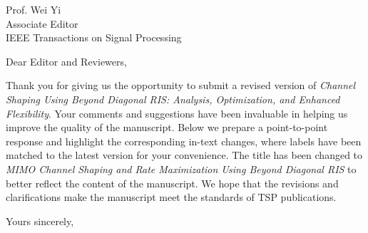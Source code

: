 \documentclass[
	fontsize=11pt,
	paper=a4,
	foldmarks=false
]{scrartcl}
\begin{document}
\begin{letter}{%
		Prof. Wei Yi\\
		Associate Editor\\
		IEEE Transactions on Signal Processing
	}
	\opening{Dear Editor and Reviewers,}
	Thank you for giving us the opportunity to submit a revised version of \emph{Channel Shaping Using Beyond Diagonal RIS: Analysis, Optimization, and Enhanced Flexibility}.
	Your comments and suggestions have been invaluable in helping us improve the quality of the manuscript.
	Below we prepare a point-to-point response and highlight the corresponding in-text changes, where labels have been matched to the latest version for your convenience.
	The title has been changed to \emph{MIMO Channel Shaping and Rate Maximization Using Beyond Diagonal RIS} to better reflect the content of the manuscript.
	We hope that the revisions and clarifications make the manuscript meet the standards of TSP publications.
	\closing{Yours sincerely,}
\end{letter}
\end{document}
